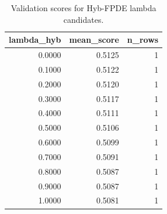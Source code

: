 \begin{table}[t]
\caption{Validation scores for Hyb-FPDE lambda candidates.}
\label{tab:lambda_distribution_computed}
\centering
\begin{tabular}{rrr}
\toprule
lambda\_hyb & mean\_score & n\_rows \\
\midrule
0.0000 & 0.5125 & 1 \\
0.1000 & 0.5122 & 1 \\
0.2000 & 0.5120 & 1 \\
0.3000 & 0.5117 & 1 \\
0.4000 & 0.5111 & 1 \\
0.5000 & 0.5106 & 1 \\
0.6000 & 0.5099 & 1 \\
0.7000 & 0.5091 & 1 \\
0.8000 & 0.5087 & 1 \\
0.9000 & 0.5087 & 1 \\
1.0000 & 0.5081 & 1 \\
\bottomrule
\end{tabular}

\end{table}
